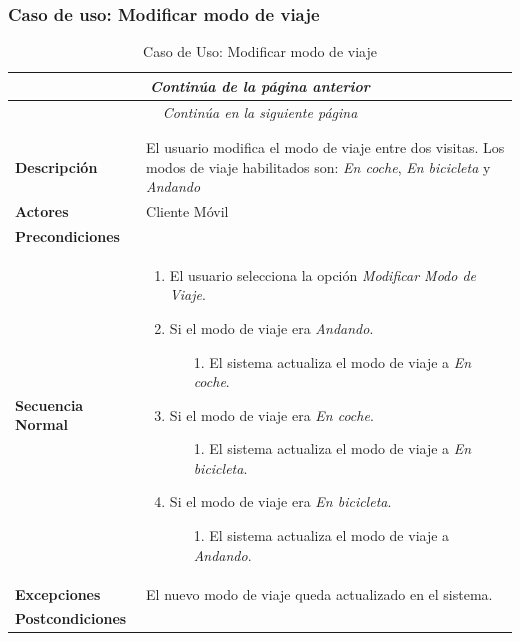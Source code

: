 \newpage
\subsubsection*{Caso de uso: Modificar modo de viaje }
\begin{longtable}{| p{4cm} | p{10cm} |}
\endfirsthead
\multicolumn{2}{c}{\textit{Continúa de la página anterior}}\\[12pt]
\hline
\endhead
\hline
\multicolumn{2}{c}{\textit{Continúa en la siguiente página}} \\
\endfoot
\hline
\caption{Caso de Uso: Modificar modo de viaje}\label{fig:1}\\
\endlastfoot


\hline
\multicolumn{2}{|c|}{\textbf{CU$<$18$>$ - Modificar Modo de Viaje}} \\

\hline
\textbf{Descripción} &
El usuario modifica el modo de viaje entre dos visitas. Los modos de viaje habilitados son: \textit{En coche}, \textit{En bicicleta} y \textit{Andando}\\

\hline
\textbf{Actores} &
Cliente Móvil\\

\hline
\textbf{Precondiciones} &
\\

\hline
\textbf{Secuencia Normal} &\mbox{}\par\vspace{-\baselineskip}
\begin{enumerate}[leftmargin=0.7cm, topsep=0.1cm]
\item El usuario selecciona la opción \textit{Modificar Modo de Viaje}.
\item Si el modo de viaje era \textit{Andando}.
	\begin{itemize}
	\item [1.] El sistema actualiza el modo de viaje a \textit{En coche}.
	\end{itemize}
\item Si el modo de viaje era \textit{En coche}.
	\begin{itemize}
	\item [1.] El sistema actualiza el modo de viaje a \textit{En bicicleta}.
	\end{itemize}
\item Si el modo de viaje era \textit{En bicicleta}.
	\begin{itemize}
	\item [1.] El sistema actualiza el modo de viaje a \textit{Andando}.
	\end{itemize}

\end{enumerate}


\\
\hline
\textbf{Excepciones} &\mbox{}\par\vspace{-\baselineskip}
El nuevo modo de viaje queda actualizado en el sistema.\\

\hline
\textbf{Postcondiciones} & \\
\hline
\end{longtable}



